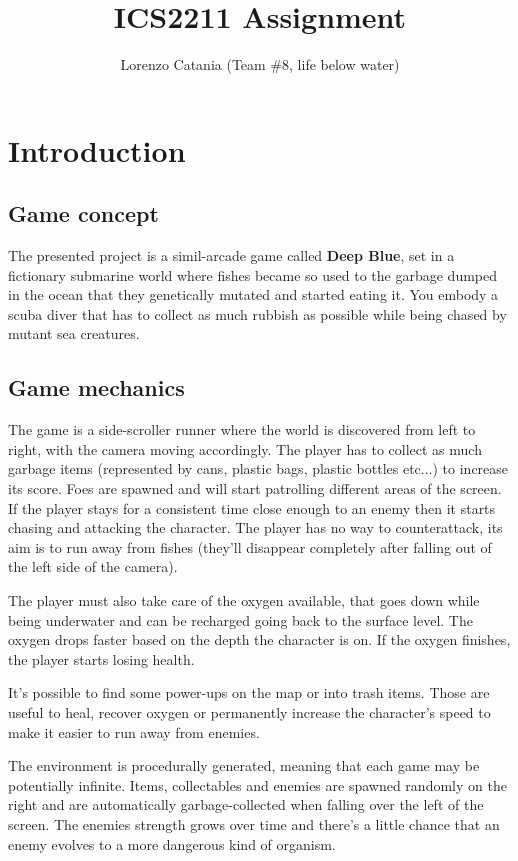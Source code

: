 \documentclass[11pt]{article}
\title{ICS2211 Assignment}
\author{Lorenzo Catania (Team \#8, life below water)}
\begin{document}
\maketitle

{
  \hypersetup{linkcolor=black}
  \tableofcontents
}

\section{Introduction}
\subsection{Game concept}
The presented project is a simil-arcade game called \textbf{Deep Blue}, set in a fictionary submarine world where fishes became so used to the garbage dumped in the ocean that they genetically mutated and started eating it.
You embody a scuba diver that has to collect as much rubbish as possible while being chased by mutant sea creatures.

\subsection{Game mechanics}
The game is a side-scroller runner where the world is discovered from left to right, with the camera moving accordingly.
The player has to collect as much garbage items (represented by cans, plastic bags, plastic bottles etc...) to increase its score.
Foes are spawned and will start patrolling different areas of the screen. If the player stays for a consistent time close enough to an enemy then it starts chasing and attacking the character. The player has no way to counterattack, its aim is to run away from fishes (they'll disappear completely after falling out of the left side of the camera).

The player must also take care of the oxygen available, that goes down while being underwater and can be recharged going back to the surface level. The oxygen drops faster based on the depth the character is on.
If the oxygen finishes, the player starts losing health.

It's possible to find some power-ups on the map or into trash items.
Those are useful to heal, recover oxygen or permanently increase the character's speed to make it easier to run away from enemies.

The environment is procedurally generated, meaning that each game may be potentially infinite. Items, collectables and enemies are spawned randomly on the right and are automatically garbage-collected when falling over the left of the screen.
The enemies strength grows over time and there's a little chance that an enemy evolves to a more dangerous kind of organism.
\end{document}
